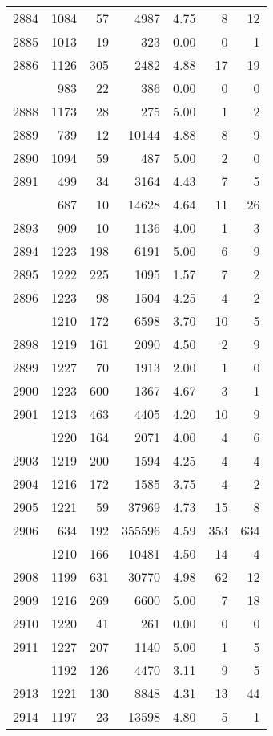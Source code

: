 \documentclass[
]{article}
\begin{document}
\begin{table}
\begin{tabular}[t]{lrrrrrr}
2884 & 1084 & 57 & 4987 & 4.75 & 8 & 12\\
2885 & 1013 & 19 & 323 & 0.00 & 0 & 1\\
2886 & 1126 & 305 & 2482 & 4.88 & 17 & 19\\
\addlinespace
2887 & 983 & 22 & 386 & 0.00 & 0 & 0\\
2888 & 1173 & 28 & 275 & 5.00 & 1 & 2\\
2889 & 739 & 12 & 10144 & 4.88 & 8 & 9\\
2890 & 1094 & 59 & 487 & 5.00 & 2 & 0\\
2891 & 499 & 34 & 3164 & 4.43 & 7 & 5\\
\addlinespace
2892 & 687 & 10 & 14628 & 4.64 & 11 & 26\\
2893 & 909 & 10 & 1136 & 4.00 & 1 & 3\\
2894 & 1223 & 198 & 6191 & 5.00 & 6 & 9\\
2895 & 1222 & 225 & 1095 & 1.57 & 7 & 2\\
2896 & 1223 & 98 & 1504 & 4.25 & 4 & 2\\
\addlinespace
2897 & 1210 & 172 & 6598 & 3.70 & 10 & 5\\
2898 & 1219 & 161 & 2090 & 4.50 & 2 & 9\\
2899 & 1227 & 70 & 1913 & 2.00 & 1 & 0\\
2900 & 1223 & 600 & 1367 & 4.67 & 3 & 1\\
2901 & 1213 & 463 & 4405 & 4.20 & 10 & 9\\
\addlinespace
2902 & 1220 & 164 & 2071 & 4.00 & 4 & 6\\
2903 & 1219 & 200 & 1594 & 4.25 & 4 & 4\\
2904 & 1216 & 172 & 1585 & 3.75 & 4 & 2\\
2905 & 1221 & 59 & 37969 & 4.73 & 15 & 8\\
2906 & 634 & 192 & 355596 & 4.59 & 353 & 634\\
\addlinespace
2907 & 1210 & 166 & 10481 & 4.50 & 14 & 4\\
2908 & 1199 & 631 & 30770 & 4.98 & 62 & 12\\
2909 & 1216 & 269 & 6600 & 5.00 & 7 & 18\\
2910 & 1220 & 41 & 261 & 0.00 & 0 & 0\\
2911 & 1227 & 207 & 1140 & 5.00 & 1 & 5\\
\addlinespace
2912 & 1192 & 126 & 4470 & 3.11 & 9 & 5\\
2913 & 1221 & 130 & 8848 & 4.31 & 13 & 44\\
2914 & 1197 & 23 & 13598 & 4.80 & 5 & 1\\

\end{tabular}
\end{table}
\end{document}
